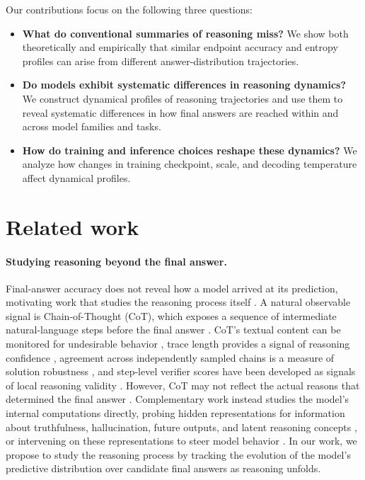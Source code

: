 \documentclass{article}
\begin{document}
Our contributions focus on the following three questions:
\begin{itemize}
    \item \textbf{What do conventional summaries of reasoning miss?} We show both theoretically and empirically that similar endpoint accuracy and entropy profiles can arise from different answer-distribution trajectories.
    \item \textbf{Do models exhibit systematic differences in reasoning dynamics?} We construct dynamical profiles of reasoning trajectories and use them to reveal systematic differences in how final answers are reached within and across model families and tasks.
    \item \textbf{How do training and inference choices reshape these dynamics?} We analyze how changes in training checkpoint, scale, and decoding temperature affect dynamical profiles. 
\end{itemize}

\section{Related work}

\paragraph{Studying reasoning beyond the final answer.}
Final-answer accuracy does not reveal how a model arrived at its prediction, motivating work that studies the reasoning process itself \cite{prasad2023receval,xia2025evaluating}. A natural observable signal is Chain-of-Thought (CoT), which exposes a sequence of intermediate natural-language steps before the final answer \cite{kojima2022large, wei2022chain}. CoT's textual content can be monitored for undesirable behavior \cite{baker2025monitoring, emmons2025chainthoughtnecessarylanguage, korbak2025chain}, trace length provides a signal of reasoning confidence \cite{devic2025tracelengthsimpleuncertainty}, agreement across independently sampled chains is a measure of solution robustness \cite{wang2023selfconsistency}, and step-level verifier scores have been developed as signals of local reasoning validity \cite{uesato2022solving, lightman2024let}. However, CoT may not reflect the actual reasons that determined the final answer \cite{turpin2023language, arcuschinchain, lanham2023measuring}. Complementary work instead studies the model’s internal computations directly, probing hidden representations for information about truthfulness, hallucination, future outputs, and latent reasoning concepts \cite{azaria2023the, marks2024geometrytruthemergentlinear, chen2024insidellmsinternalstates, pal2023future, gurnee2026verbalizable}, or intervening on these representations to steer model behavior \cite{zou2025representationengineeringtopdownapproach, turner2024steeringlanguagemodelsactivation}. In our work, we propose to study the reasoning process by tracking the evolution of the model's predictive distribution over candidate final answers as reasoning unfolds.
\end{document}
